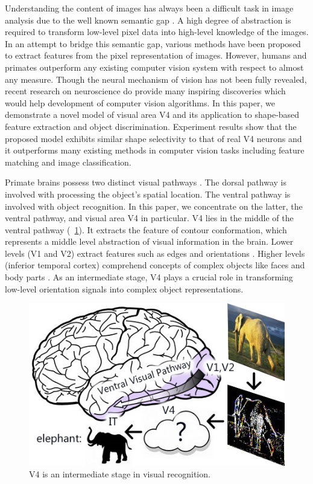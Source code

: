 \documentclass[10pt]{article}
\begin{document}
Understanding the content of images has always been a difficult task in image analysis due to the well known semantic gap \cite{smeulders2000}.
A high degree of abstraction is required to transform low-level pixel data into high-level knowledge of the images.
In an attempt to bridge this semantic gap, various methods have been proposed to extract features from the pixel representation of images.
However, humans and primates outperform any existing computer vision system with respect to almost any measure.
Though the neural mechanism of vision has not been fully revealed,
recent research on neuroscience do provide many inspiring discoveries which would help development of computer vision algorithms.
In this paper, we demonstrate a novel model of visual area V4 and its application to shape-based feature extraction and object discrimination.
Experiment results show that the proposed model exhibits similar shape selectivity to that of real V4 neurons
and it outperforms many existing methods in computer vision tasks including feature matching and image classification. 

Primate brains possess two distinct visual pathways \cite{ettlinger1990,lehky2007}.
The dorsal pathway is involved with processing the object's spatial location. 
The ventral pathway is involved with object recognition.
In this paper, we concentrate on the latter, the ventral pathway, and visual area V4 in particular.
V4 lies in the middle of the ventral pathway (\figurename~\ref{fig:1}).
It extracts the feature of contour conformation, which represents a middle level abstraction of visual information in the brain.
Lower levels (V1 and V2) extract features such as edges and orientations \cite{hubel1962,hubel1965}.
Higher levels (inferior temporal cortex) comprehend concepts of complex objects like faces and body parts \cite{bruce1981,bell2009}.
As an intermediate stage, V4 plays a crucial role in transforming low-level orientation signals into complex object representations.

\begin{figure}
\centerline{\includegraphics[width=0.8\linewidth]{images/fig1.jpg}} 
\caption{V4 is an intermediate stage in visual recognition.}
\label{fig:1}
\end{figure}
\end{document}
